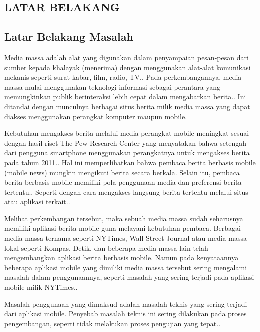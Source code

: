 \begin{spacing}{2}
\chapter{LATAR BELAKANG}

\section{Latar Belakang Masalah}
Media massa adalah alat yang digunakan dalam penyampaian pesan-pesan dari sumber kepada khalayak (menerima) dengan menggunakan alat-alat komunikasi mekanis seperti surat kabar, film, radio, TV.\cite{Hafied2005}. Pada perkembangannya, media massa mulai menggunakan teknologi informasi sebagai perantara yang memungkinkan publik berinteraksi lebih cepat dalam mengabarkan berita.\cite{maulana2016}. Ini ditandai dengan munculnya berbagai situs berita milik media massa yang dapat diakses menggunakan perangkat komputer maupun mobile.

Kebutuhan mengakses berita melalui media perangkat mobile meningkat sesuai dengan hasil riset The Pew Research Center yang menyatakan bahwa setengah dari pengguna smartphone menggunakan perangkatnya untuk mengakses berita pada tahun 2011.\cite{journalism2012}. Hal ini memperlihatkan bahwa pembaca berita berbasis mobile (mobile news) mungkin mengikuti berita secara berkala. Selain itu, pembaca berita berbasis mobile memiliki pola penggunaan media dan preferensi berita tertentu.\cite{sylvia2012}. Seperti dengan cara mengakses langsung berita tertentu melalui situs atau aplikasi terkait.\cite{journalism2012}.

Melihat perkembangan tersebut, maka sebuah media massa sudah seharusnya memiliki aplikasi berita mobile guna melayani kebutuhan pembaca. Berbagai media massa ternama seperti NYTimes, Wall Street Journal atau media massa lokal seperti Kompas, Detik, dan beberapa media massa lain telah mengembangkan aplikasi berita berbasis mobile. Namun pada kenyataannya beberapa aplikasi mobile yang dimiliki media massa tersebut sering mengalami masalah dalam penggunaannya, seperti masalah yang sering terjadi pada aplikasi mobile milik NYTimes.\cite{martin2011}.

Masalah penggunaan yang dimaksud adalah masalah teknis yang sering terjadi dari aplikasi mobile. Penyebab masalah teknis ini sering dilakukan pada proses pengembangan, seperti tidak melakukan proses pengujian yang tepat.\cite{shiv2015}.


\end{spacing}
